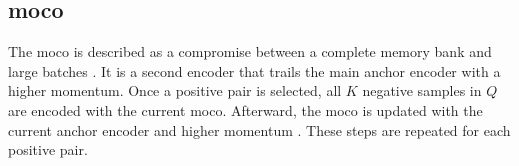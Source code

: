 \subsection{\acl{moco}}\label{subsec:MoCo}
The \ac{moco} is described as a compromise between a complete memory bank and large batches \citet{mochi_2020}.
It is a second encoder that trails the main anchor encoder with a higher momentum.
Once a positive pair is selected, all $K$ negative samples in $Q$ are encoded with the current \ac{moco}.
Afterward, the \ac{moco} is updated with the current anchor encoder and higher momentum  \citet{mochi_2020,li_prototypical_2021}. 
These steps are repeated for each positive pair.